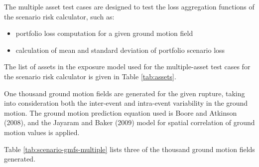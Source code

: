The multiple asset test cases are designed to test the loss aggregation functions of the scenario risk calculator, such as:

\begin{itemize}
\item portfolio loss computation for a given ground motion field
\item calculation of mean and standard deviation of portfolio scenario loss
\end{itemize}



The list of assets in the exposure model used for the multiple-asset test cases for the scenario risk calculator is given in Table \ref{tab:assets}.

One thousand ground motion fields are generated for the given rupture, taking into consideration both the inter-event and intra-event variability in the ground motion. The ground motion prediction equation used is Boore and Atkinson (2008), and the Jayaram and Baker (2009) model for spatial correlation of ground motion values is applied.



Table \ref{tab:scenario-gmfs-multiple} lists three of the thousand ground motion fields generated.
